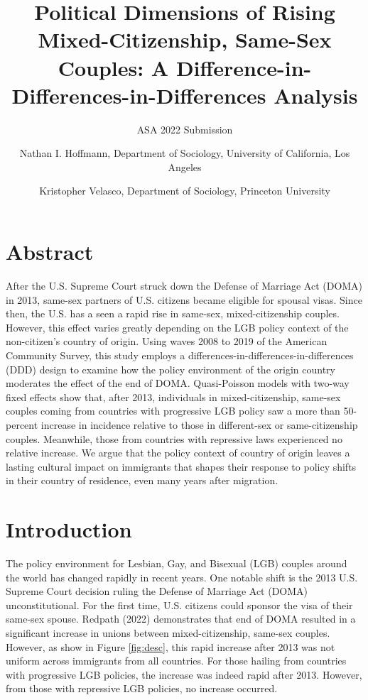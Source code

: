 \documentclass[
  12pt,
]{article}
\title{Political Dimensions of Rising Mixed-Citizenship, Same-Sex Couples: A Difference-in-Differences-in-Differences Analysis}
\subtitle{ASA 2022 Submission}
\author{Nathan I. Hoffmann, Department of Sociology, University of California, Los Angeles \and Kristopher Velasco, Department of Sociology, Princeton University}
\date{}
\begin{document}
\maketitle

\hypertarget{abstract}{%
\section{Abstract}\label{abstract}}

After the U.S. Supreme Court struck down the Defense of Marriage Act (DOMA) in 2013, same-sex partners of U.S. citizens became eligible for spousal visas. Since then, the U.S. has a seen a rapid rise in same-sex, mixed-citizenship couples. However, this effect varies greatly depending on the LGB policy context of the non-citizen's country of origin. Using waves 2008 to 2019 of the American Community Survey, this study employs a differences-in-differences-in-differences (DDD) design to examine how the policy environment of the origin country moderates the effect of the end of DOMA. Quasi-Poisson models with two-way fixed effects show that, after 2013, individuals in mixed-citizenship, same-sex couples coming from countries with progressive LGB policy saw a more than 50-percent increase in incidence relative to those in different-sex or same-citizenship couples. Meanwhile, those from countries with repressive laws experienced no relative increase. We argue that the policy context of country of origin leaves a lasting cultural impact on immigrants that shapes their response to policy shifts in their country of residence, even many years after migration.

\hypertarget{introduction}{%
\section{Introduction}\label{introduction}}

The policy environment for Lesbian, Gay, and Bisexual (LGB) couples around the world has changed rapidly in recent years. One notable shift is the 2013 U.S. Supreme Court decision ruling the Defense of Marriage Act (DOMA) unconstitutional. For the first time, U.S. citizens could sponsor the visa of their same-sex spouse. Redpath (2022) demonstrates that end of DOMA resulted in a significant increase in unions between mixed-citizenship, same-sex couples. However, as show in Figure \ref{fig:desc}, this rapid increase after 2013 was not uniform across immigrants from all countries. For those hailing from countries with progressive LGB policies, the increase was indeed rapid after 2013. However, from those with repressive LGB policies, no increase occurred.
\end{document}
